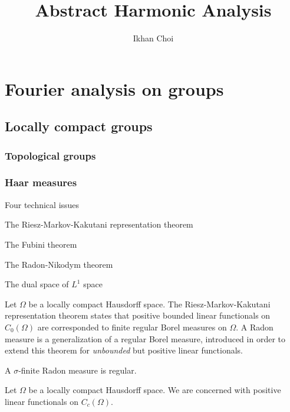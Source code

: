 \documentclass{../../large}
\begin{document}
\title{Abstract Harmonic Analysis}
\author{Ikhan Choi}
\maketitle
\tableofcontents



\part{Fourier analysis on groups}
\chapter{Locally compact groups}
\section{Topological groups}
\section{Haar measures}

\begin{prb}
Four technical issues
\begin{parts}
\item The Riesz-Markov-Kakutani representation theorem
\item The Fubini theorem
\item The Radon-Nikodym theorem
\item The dual space of $L^1$ space
\end{parts}
\end{prb}

\begin{prb}
Let $\Omega$ be a locally compact Hausdorff space.
The Riesz-Markov-Kakutani representation theorem states that positive bounded linear functionals on $C_0(\Omega)$ are corresponded to finite regular Borel measures on $\Omega$.
A Radon measure is a generalization of a regular Borel measure, introduced in order to extend this theorem for \emph{unbounded} but positive linear functionals.
\begin{parts}
\item A $\sigma$-finite Radon measure is regular.
\end{parts}
\end{prb}

\begin{prb}
Let $\Omega$ be a locally compact Hausdorff space.
We are concerned with positive linear functionals on $C_c(\Omega)$.
\end{prb}
\end{document}
